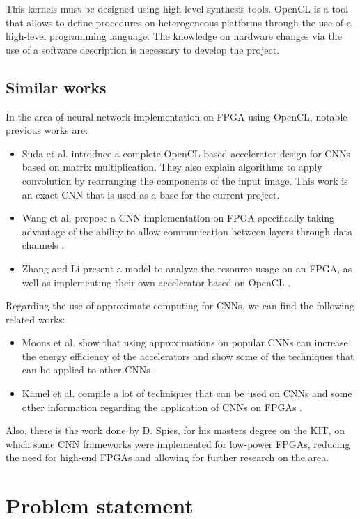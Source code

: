 This kernels must be designed using high-level synthesis tools. OpenCL is a tool that allows to define 
procedures on heterogeneous platforms through the 
use of a high-level programming language. The knowledge on hardware changes via the use of a software 
description is necessary to develop the project.

\subsection{Similar works}

In the area of neural network implementation on FPGA using OpenCL, notable previous works are:
\begin{itemize}
    \item Suda et al. introduce a complete OpenCL-based accelerator design for CNNs based on
    matrix multiplication. They also explain algorithms to apply convolution by rearranging
    the components of the input image. This work is an exact CNN that is used as a base
    for the current project. \cite{suda}
    \item Wang et al. propose a CNN implementation on FPGA specifically taking advantage of 
    the ability to allow communication between layers through data channels \cite{pipecnn}.
    \item Zhang and Li present a model to analyze the resource usage on an FPGA, as well as
    implementing their own accelerator based on OpenCL \cite{zhangcnn}.
\end{itemize}

Regarding the use of approximate computing for CNNs, we can find the following related works:
\begin{itemize}
    \item Moons et al. show that using approximations on popular CNNs can increase the energy
    efficiency of the accelerators and show some of the techniques that can be applied to other
    CNNs \cite{moons}.
    \item Kamel et al. compile a lot of techniques that can be used on CNNs and some other 
    information regarding the application of CNNs on FPGAs \cite{kamel}.
\end{itemize}

Also, there is the work done by D. Spies, for his masters degree on the KIT,
on which some CNN frameworks were implemented for low-power FPGAs, reducing the need for high-end
FPGAs and allowing for further research on the area.

\section{Problem statement}

